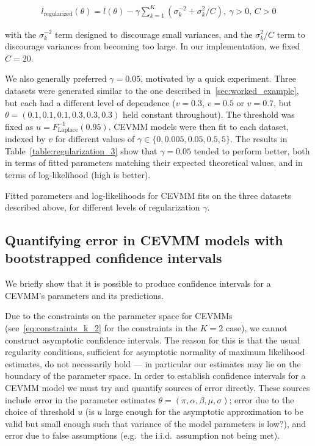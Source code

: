 \documentclass[11pt,twoside,openany]{book}
\numberwithin{Theorem}{chapter}
\numberwithin{Definition}{chapter}
\numberwithin{Lemma}{chapter}
\numberwithin{Algorithm}{chapter}
\numberwithin{equation}{chapter}
\begin{document}
\begin{align*}
  l_\text{regularized}(\theta) = l(\theta) - \gamma \sum_{k=1}^K (\sigma_k^{-2} + \sigma_k^2 / C),\ \gamma > 0,\, C > 0
\end{align*}

with the $\sigma_k^{-2}$ term designed to discourage small variances, and the $\sigma_k^2/C$
term to discourage variances from becoming too large. In our implementation,
we fixed $C=20$.

We also generally preferred $\gamma=0.05$, motivated
by a quick experiment. Three datasets were
generated similar to the one described in~\ref{sec:worked_example}, but each had a
different level of dependence ($v=0.3$, $v=0.5$ or $v=0.7$, but
$\theta=(0.1,0.1,0.1,0.3,0.3,0.3)$ held constant throughout).
The threshold was fixed as $u=F_{\text{Laplace}}^{-1}(0.95)$.
CEVMM models were then fit to each dataset, indexed by $v$
for different values of $\gamma\in\{0,0.005,0.05,0.5,5\}$. The results in Table~\ref{table:regularization_3}
show that $\gamma=0.05$ tended to perform better, both in terms of fitted parameters
matching their expected theoretical values, and in terms of log-likelihood (high is better).


\begin{table}[htp]
  \centering
    
\caption{Fitted parameters and log-likelihoods for CEVMM fits on the three
datasets described above, for different levels of regularization $\gamma$.\label{table:regularization_3}}
\end{table}




\subsection{Quantifying error in CEVMM models with bootstrapped confidence
intervals}\label{sec:cevvm_uncertainty}


We briefly show that it is possible to produce confidence intervals
for a CEVMM's parameters and its predictions.


Due to the constraints on the parameter space for CEVMMs
(see~\eqref{eq:constraints_k_2} for the constraints in the $K=2$ case),
we cannot construct asymptotic confidence intervals.
The reason for this is that the usual regularity conditions, sufficient for
asymptotic normality of maximum likelihood estimates, do not necessarily hold
--- in particular our estimates may lie on the boundary of the parameter space.
In order to establish confidence intervals for a CEVMM model we must
try and quantify sources of error directly. These sources include
error in the parameter estimates $\theta=(\pi,\alpha,\beta,\mu,\sigma)$;
error due to the choice of threshold $u$ (is $u$ large enough
    for the asymptotic approximation to be valid but small enough such that
    variance of the model parameters is low?), and error due to false assumptions (e.g.\ the i.i.d.\ assumption not being met).
\end{document}
